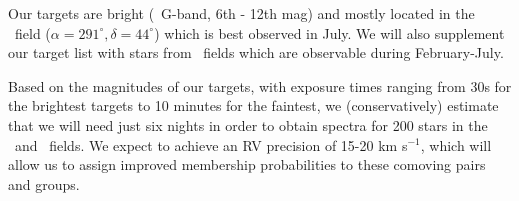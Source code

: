 
%
%


%
%

\feasibility

Our targets are bright (\gaia\ G-band, 6th - 12th mag) and mostly located in
the \kepler\ field ($\alpha = 291^{\circ}, \delta = 44^{\circ}$) which is best
observed in July.
We will also supplement our target list with stars from \ktwo\ fields which
are observable during February-July.

Based on the magnitudes of our targets, with exposure times ranging from 30s
for the brightest targets to 10 minutes for the faintest, we (conservatively)
estimate that we will need just six nights in order to obtain spectra for 200
stars in the \kepler\ and \ktwo\ fields.
We expect to achieve an RV precision of 15-20 km s$^{-1}$, which will allow us
to assign improved membership probabilities to these comoving pairs and
groups.

